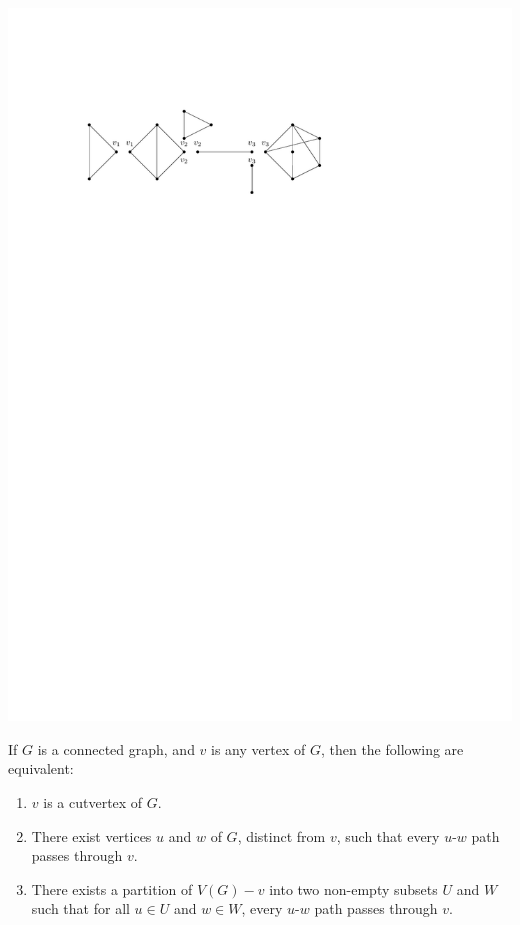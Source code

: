 \begin{Example}
\begin{center}
\includegraphics{6BlockGraph2-Blocks.pdf}
\end{center}
\end{Example}

\begin{Theorem}\label{thm:CutverChar}
If $G$ is a connected graph, and $v$ is any vertex of $G$, then the following are equivalent:
\begin{enumerate}[label=(\roman*)]
\item\label{it:CutverChar1} $v$ is a cutvertex of $G$.
\item\label{it:CutverChar2} There exist vertices $u$ and $w$ of $G$, distinct from $v$, such that every $u$-$w$ path passes through $v$.
\item\label{it:CutverChar3} There exists a partition of $V(G) - v$ into two non-empty subsets $U$ and $W$ such that for all $u \in U$ and $w \in W$, every $u$-$w$ path passes through $v$.
\end{enumerate}
\end{Theorem}

